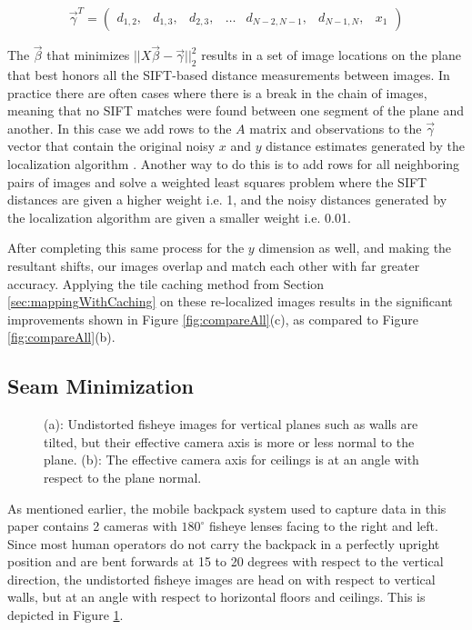 \documentclass[10pt,twocolumn,letterpaper]{article}
\begin{document}
\[
\vec{\gamma}^T =
\begin{pmatrix}
  d_{1,2}, &d_{1,3}, &d_{2,3}, &\hdots &d_{N-2,N-1}, &d_{N-1,N}, &x_1
\end{pmatrix}
\]

The $\vec{\beta}$ that minimizes $||X \vec{\beta} -
\vec{\gamma}||_2^2$ results in a set of image locations on the plane
that best honors all the SIFT-based distance measurements between
images. In practice there are often cases where there is a break in
the chain of images, meaning that no SIFT matches were found between
one segment of the plane and another. In this case we add rows to the
$A$ matrix and observations to the $\vec{\gamma}$ vector that contain
the original noisy $x$ and $y$ distance estimates generated by the
localization algorithm \cite{chen2010indoor, liu2010indoor}. Another
way to do this is to add rows for all neighboring pairs of images and
solve a weighted least squares problem where the SIFT distances are
given a higher weight i.e. 1, and the noisy distances generated by the
localization algorithm \cite{chen2010indoor, liu2010indoor} are given
a smaller weight i.e. 0.01.

After completing this same process for the $y$ dimension as well, and
making the resultant shifts, our images overlap and match each other
with far greater accuracy. Applying the tile caching method from
Section \ref{sec:mappingWithCaching} on these re-localized images
results in the significant improvements shown in Figure
\ref{fig:compareAll}(c), as compared to Figure \ref{fig:compareAll}(b).


\subsection{Seam Minimization}
\label{sec:seamMinimization}

\begin{figure}
  \centering
  \centering
  \caption{(a): Undistorted fisheye images for vertical planes such as
    walls are tilted, but their effective camera axis is more or less
    normal to the plane. (b): The effective camera axis for ceilings
    is at an angle with respect to the plane normal.}
  \label{fig:projectionAngles}
\end{figure}



As mentioned earlier, the mobile backpack system used to capture data
in this paper contains 2 cameras with $180^\circ$ fisheye lenses
facing to the right and left. Since most human operators do not carry
the backpack in a perfectly upright position and are bent forwards at
15 to 20 degrees with respect to the vertical direction, the
undistorted fisheye images are head on with respect to vertical walls,
but at an angle with respect to horizontal floors and ceilings. This
is depicted in Figure \ref{fig:projectionAngles}.
\end{document}
